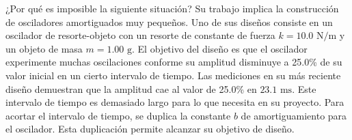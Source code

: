 \item ¿Por qué es imposible la siguiente situación? Su trabajo implica la construcción de osciladores amortiguados muy pequeños. Uno de sus diseños consiste en un oscilador de resorte-objeto con un resorte de constante de fuerza $k = 10.0\text{ N/m}$ y un objeto de masa $m = 1.00\text{ g}$. El objetivo del diseño es que el oscilador experimente muchas oscilaciones conforme su amplitud disminuye a 25.0\% de su valor inicial en un cierto intervalo de tiempo. Las mediciones en su más reciente diseño demuestran que la amplitud cae al valor de 25.0\% en $23.1\text{ ms}$. Este intervalo de tiempo es demasiado largo para lo que necesita en su proyecto. Para acortar el intervalo de tiempo, se duplica la constante $b$ de amortiguamiento para el oscilador. Esta duplicación permite alcanzar su objetivo de diseño.